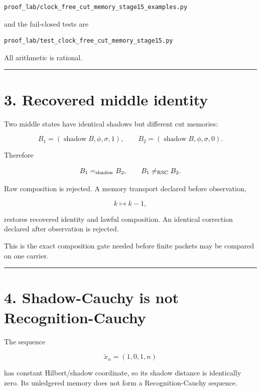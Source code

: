 \begin{verbatim}
proof_lab/clock_free_cut_memory_stage15_examples.py
\end{verbatim}

and the fail-closed tests are

\begin{verbatim}
proof_lab/test_clock_free_cut_memory_stage15.py
\end{verbatim}

All arithmetic is rational.

\begin{center}\rule{0.5\linewidth}{0.5pt}\end{center}

\hypertarget{recovered-middle-identity}{%
\section{3. Recovered middle identity}\label{recovered-middle-identity}}

Two middle states have identical shadows but different cut memories:

\[
B_1=(\operatorname{shadow}B,\phi,\sigma,1),
\qquad
B_2=(\operatorname{shadow}B,\phi,\sigma,0).
\]

Therefore

\[
B_1=_{\rm shadow}B_2,
\qquad
B_1\ne_{\rm RSC}B_2.
\]

Raw composition is rejected. A memory transport declared before observation,

\[
k\mapsto k-1,
\]

restores recovered identity and lawful composition. An identical correction declared after observation is rejected.

This is the exact composition gate needed before finite packets may be compared on one carrier.

\begin{center}\rule{0.5\linewidth}{0.5pt}\end{center}

\hypertarget{shadow-cauchy-is-not-recognition-cauchy}{%
\section{4. Shadow-Cauchy is not Recognition-Cauchy}\label{shadow-cauchy-is-not-recognition-cauchy}}

The sequence

\[
\widetilde x_n=(1,0,1,n)
\]

has constant Hilbert/shadow coordinate, so its shadow distance is identically zero. Its unledgered memory does not form a Recognition-Cauchy sequence.

